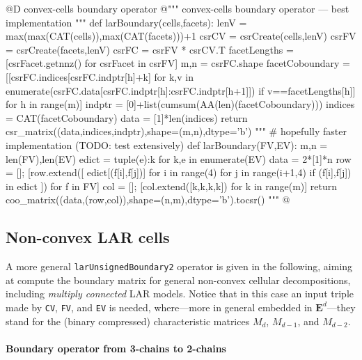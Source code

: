 \documentclass[11pt,oneside]{article}    %
\begin{document}
@D convex-cells boundary operator
@{""" convex-cells boundary operator --- best implementation """
def larBoundary(cells,facets):
    lenV = max(max(CAT(cells)),max(CAT(facets)))+1
    csrCV = csrCreate(cells,lenV)
    csrFV = csrCreate(facets,lenV)
    csrFC = csrFV * csrCV.T
    facetLengths = [csrFacet.getnnz() for csrFacet in csrFV]
    m,n = csrFC.shape
    facetCoboundary = [[csrFC.indices[csrFC.indptr[h]+k] 
        for k,v in enumerate(csrFC.data[csrFC.indptr[h]:csrFC.indptr[h+1]]) 
            if v==facetLengths[h]] for h in range(m)]
    indptr = [0]+list(cumsum(AA(len)(facetCoboundary)))
    indices = CAT(facetCoboundary)
    data = [1]*len(indices)
    return csr_matrix((data,indices,indptr),shape=(m,n),dtype='b')
"""
# hopefully faster implementation (TODO: test extensively)
def larBoundary(FV,EV):
	m,n = len(FV),len(EV)
	edict = {tuple(e):k for k,e in enumerate(EV)}
	data = 2*[1]*n
	row = []; [row.extend([ edict[(f[i],f[j])] for i in range(4) for j in range(i+1,4) 
			if (f[i],f[j]) in edict ]) for f in FV]
	col = []; [col.extend([k,k,k,k]) for k in range(m)]
	return coo_matrix((data,(row,col)),shape=(n,m),dtype='b').tocsr()
"""
@}


\subsection{Non-convex LAR cells}

A more general \texttt{larUnsignedBoundary2} operator is given in the following, aiming at compute the boundary matrix for general non-convex cellular decompositions, including \emph{multiply connected} LAR models.
Notice that in this case an input triple made by \texttt{CV}, \texttt{FV}, and \texttt{EV} is needed,
where---more in general embedded in $\mathbf{E}^d$---they stand for the (binary compressed) characteristic matrices $M_d$, $M_{d-1}$, and $M_{d-2}$.

\paragraph{Boundary operator from 3-chains to 2-chains}
\end{document}
